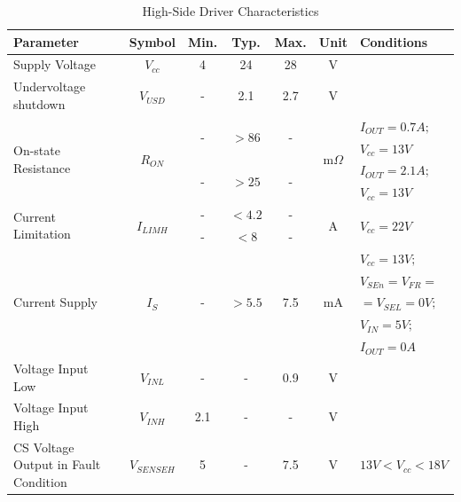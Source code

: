 \documentclass[10pt]{datasheet}
\begin{document}
\begin{table}[H]
\begin{threeparttable}
\caption{High-Side Driver Characteristics}
\label{table:power_switch_char}
\begin{tabularx}{\textwidth}{l c | c| c c c | c | X}
    \thickhline
    \textbf{Parameter} & & \textbf{Symbol} & \textbf{Min.} & \textbf{Typ.} & \textbf{Max.} &
    \textbf{Unit} & \textbf{Conditions} \\
    \hline
    Supply Voltage & &$V_{cc}$ & 4 & 24\tnote{1} & 28 & V \\
    \hline
    Undervoltage shutdown & & $V_{USD}$ & - & 2.1 & 2.7 & V & \\
    \hline
    \multicolumn{1}{l|}{\multirow{4}{*}{On-state Resistance}} & \multirow{2}{*}{\cite{ref11}} &\multirow{4}{*}{$R_{ON}$} & \multirow{2}{*}{-} & \multirow{2}{*}{$>86$} & \multirow{2}{*}{-} & \multirow{4}{*}{m$\Omega$} & $I_{OUT} = 0.7A;$\\
    \multicolumn{1}{l|}{} & & & & & & &$V_{cc}=13V$\\
    \cline{2-2}
    \cline{4-6}
    \cline{8-8}
    \multicolumn{1}{l|}{} & \multirow{2}{*}{\cite{ref16}} & & \multirow{2}{*}{-} & \multirow{2}{*}{$>25$} & \multirow{2}{*}{-} & & $I_{OUT} = 2.1A;$ \\
    \multicolumn{1}{l|}{} & & & & & & &$V_{cc}=13V$\\
    \hline 
    \multicolumn{1}{l|}{\multirow{2}{*}{Current Limitation\tnote{2}}} & \cite{ref11} & \multirow{2}{*}{$I_{LIMH}$} & - & $<4.2$ & - & \multirow{2}{*}{A} & \multirow{2}{*}{$V_{cc}=22V$}\\
    \cline{2-2}
    \cline{4-6}
    \multicolumn{1}{l|}{} & \cite{ref16} & & - & $<8$ & - & &\\
    \hline
    \multirow{5}{*}{Current Supply} & &\multirow{5}{*}{$I_S$} & \multirow{5}{*}{-} & \multirow{5}{*}{$>5.5$} & \multirow{5}{*}{7.5} & \multirow{5}{*}{mA} & $V_{cc} = 13V;$\\
    & & & & & & &$V_{SEn} = V_{FR} = $\\
    & & & & & & &$= V_{SEL} = 0V;$\\
    & & & & & & &$V_{IN} = 5V;$\\
    & & & & & & &$I_{OUT} = 0A$\\
    \hline
    Voltage Input Low\tnote{3} & &$V_{INL}$ & - & - & 0.9 & V & \\
    \hline
    Voltage Input High\tnote{3} & &$V_{INH}$ & 2.1 & - & - & V & \\
    \hline
    CS Voltage Output in Fault Condition & & $V_{SENSEH}$ & 5 & - & 7.5 & V & $13V < V_{cc} < 18V$ \\

\end{tabularx}
\end{threeparttable}
\end{table}
\end{document}
